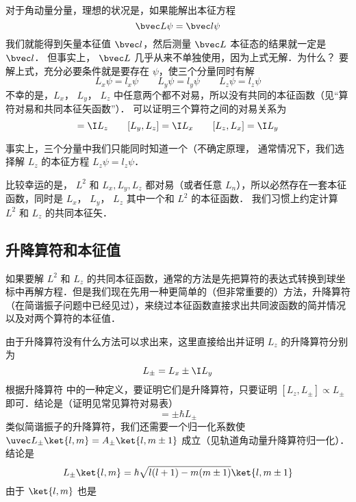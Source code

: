 对于角动量分量，理想的状况是，如果能解出本征方程
\begin{equation}
\bvec L \psi  = \bvec l\psi 
\end{equation}
我们就能得到矢量本征值 $\bvec l$，然后测量 $\bvec L$ 本征态的结果就一定是 $\bvec l$． 但事实上， $\bvec L$ 几乎从来不单独使用，因为上式无解．为什么？ 要解上式，充分必要条件就是要存在 $\psi$，使三个分量同时有解
\begin{equation}
L_x \psi  = l_x \psi \qquad
L_y \psi  = l_y \psi \qquad
L_z \psi  = l_z \psi 
\end{equation}   
不幸的是，$L_x$， $L_y$， $L_z$ 中任意两个都不对易，所以没有共同的本征函数（见“算符对易和共同本征矢函数”）． 可以证明三个算符之间的对易关系为
\begin{equation}
[L_x, L_y] = \I L_z \qquad
[L_y, L_z] = \I L_x \qquad
[L_z, L_x] = \I L_y
\end{equation}


事实上，三个分量中我们只能同时知道一个（不确定原理，%
通常情况下，我们选择解 $L_z$ 的本征方程 $L_z \psi = l_z\psi$． 

比较幸运的是， $L^2$ 和 $L_x, L_y, L_z$ 都对易（或者任意 $L_n$），所以必然存在一套本征函数，同时是 $L_x$， $L_y$，  $L_z$ 其中一个和 $L^2$ 的本征函数． 我们习惯上约定计算 $L^2$ 和 $L_z$ 的共同本征矢．

\subsection{升降算符和本征值}

如果要解 $L^2$ 和 $L_z$ 的共同本征函数，通常的方法是先把算符的表达式转换到球坐标中再解方程．但是我们现在先用一种更简单的（但非常重要的）方法，升降算符（在简谐振子问题中已经见过），来绕过本征函数直接求出共同波函数的简并情况以及对两个算符的本征值．

由于升降算符没有什么方法可以求出来，这里直接给出并证明 $L_z$ 的升降算符分别为
\begin{equation}
L_\pm = L_x \pm \I L_y
\end{equation}
根据升降算符 中的一种定义，要证明它们是升降算符，只要证明 $[L_z, L_\pm] \propto L_\pm$ 即可．结论是（证明见常见算符对易表）%
\begin{equation}
[L_z, L_\pm] =  \pm \hbar L_ \pm
\end{equation}
类似简谐振子的升降算符，我们还需要一个归一化系数使 $\uvec L_\pm \ket{l,m} = A_ \pm \ket{l,m \pm 1}$ 成立（见轨道角动量升降算符归一化）．结论是
\begin{equation}
L_\pm \ket{l, m}  = \hbar \sqrt{l(l + 1) - m(m \pm 1)} \ket{l, m \pm 1} 
\end{equation}
由于 $\ket{l,m}$ 也是

